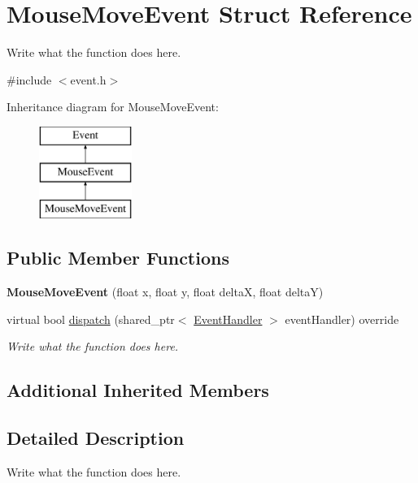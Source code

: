 \hypertarget{structMouseMoveEvent}{\section{Mouse\+Move\+Event Struct Reference}
\label{structMouseMoveEvent}
}


Write what the function does here.  




{\ttfamily \#include $<$event.\+h$>$}

Inheritance diagram for Mouse\+Move\+Event\+:\begin{figure}[H]
\begin{center}
\leavevmode
\includegraphics[height=3.000000cm]{structMouseMoveEvent}
\end{center}
\end{figure}
\subsection*{Public Member Functions}
\begin{DoxyCompactItemize}
\item 
\hypertarget{structMouseMoveEvent_abf421414902d34aa2d9435cc485fc4c8}{{\bfseries Mouse\+Move\+Event} (float x, float y, float delta\+X, float delta\+Y)}\label{structMouseMoveEvent_abf421414902d34aa2d9435cc485fc4c8}

\item 
virtual bool \hyperlink{structMouseMoveEvent_a2718ebd4f6f40d533773e59530372d62}{dispatch} (shared\+\_\+ptr$<$ \hyperlink{structEventHandler}{Event\+Handler} $>$ event\+Handler) override
\begin{DoxyCompactList}\small\item\em Write what the function does here. \end{DoxyCompactList}\end{DoxyCompactItemize}
\subsection*{Additional Inherited Members}


\subsection{Detailed Description}
Write what the function does here. 


